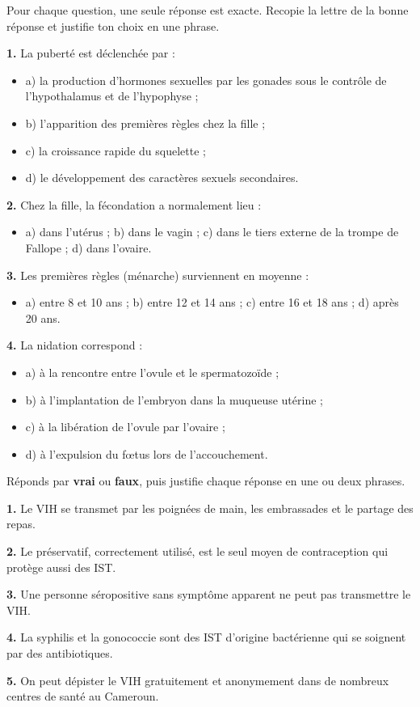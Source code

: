 \documentclass[11pt]{article}
\begin{document}
\begin{exercice}
Pour chaque question, une seule réponse est exacte. Recopie la lettre de la bonne réponse et justifie ton choix en une phrase.

\textbf{1.} La puberté est déclenchée par :
\begin{itemize}
\item a) la production d'hormones sexuelles par les gonades sous le contrôle de l'hypothalamus et de l'hypophyse ;
\item b) l'apparition des premières règles chez la fille ;
\item c) la croissance rapide du squelette ;
\item d) le développement des caractères sexuels secondaires.
\end{itemize}

\textbf{2.} Chez la fille, la fécondation a normalement lieu :
\begin{itemize}
\item a) dans l'utérus ; \quad b) dans le vagin ; \quad c) dans le tiers externe de la trompe de Fallope ; \quad d) dans l'ovaire.
\end{itemize}

\textbf{3.} Les premières règles (ménarche) surviennent en moyenne :
\begin{itemize}
\item a) entre 8 et 10 ans ; \quad b) entre 12 et 14 ans ; \quad c) entre 16 et 18 ans ; \quad d) après 20 ans.
\end{itemize}

\textbf{4.} La nidation correspond :
\begin{itemize}
\item a) à la rencontre entre l'ovule et le spermatozoïde ;
\item b) à l'implantation de l'embryon dans la muqueuse utérine ;
\item c) à la libération de l'ovule par l'ovaire ;
\item d) à l'expulsion du fœtus lors de l'accouchement.
\end{itemize}
\end{exercice}

\begin{exercice}
Réponds par \textbf{vrai} ou \textbf{faux}, puis justifie chaque réponse en une ou deux phrases.

\textbf{1.} Le VIH se transmet par les poignées de main, les embrassades et le partage des repas.

\textbf{2.} Le préservatif, correctement utilisé, est le seul moyen de contraception qui protège aussi des IST.

\textbf{3.} Une personne séropositive sans symptôme apparent ne peut pas transmettre le VIH.

\textbf{4.} La syphilis et la gonococcie sont des IST d'origine bactérienne qui se soignent par des antibiotiques.

\textbf{5.} On peut dépister le VIH gratuitement et anonymement dans de nombreux centres de santé au Cameroun.
\end{exercice}
\end{document}
